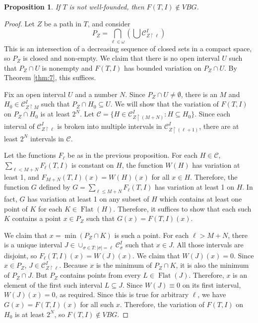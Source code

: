 \documentclass[12pt]{amsart}
\newtheorem{prop}[theorem]{Proposition}
\newcommand{\uhr}{\upharpoonright}
\newcommand{\C}{\mathcal C}
\renewcommand{\flat}{\operatorname{Flat}}
\begin{document}
\begin{prop}\label{prop:14} 
If $T$ is not well-founded, then $F(T,I) \not\in VBG$.
\end{prop}
\begin{proof}
Let $Z$ be a path in $T$, and consider 
$$P_Z = \bigcap_{\ell\in \omega} \left(\bigcup \C_{Z\uhr \ell}^I\right)$$
This is an intersection of a decreasing sequence of closed sets in a 
compact space, so $P_Z$ is closed and non-empty.  
We claim that there is no open interval $U$ such that $P_Z \cap U$ is 
nonempty and $F(T,I)$ has 
bounded variation on $P_Z \cap U$.  By Theorem \ref{thm:7}, this suffices.

Fix an open interval $U$ and a number $N$.  Since $P_Z \cap U \neq \emptyset$, 
there is an $M$ and $H_0 \in \C_{Z\uhr M}^I$ such that $P_Z\cap H_0 \subseteq U$.  
We will show that the variation of 
$F(T,I)$ on $P_Z \cap H_0$ is at least $2^N$.
Let $\C = \{H \in \C_{Z\uhr (M+N)}^I : H \subseteq H_0\}$.  Since each interval of 
$\C_{Z\uhr \ell}^I$ is broken into multiple intervals 
in $\C_{Z\uhr (\ell+1)}^I$, there are at least $2^N$ intervals in $\C$.

Let the functions $F_\ell$ be as in the previous proposition.
For each $H \in \C$, $\sum_{\ell < M+N} F_\ell(T,I)$ is constant on $H$, 
the function $W(H)$ has variation at least 1, 
and $F_{M+N}(T,I)(x)=W(H)(x)$ for all $x \in H$.
Therefore, the function $G$ defined by 
$G=\sum_{\ell \leq M+N} F_{\ell}(T,I)$ has variation at least 1 on $H$.  
In fact, $G$ has variation at least 1 on any subset of $H$ 
which contains at least one point of $K$ for each $K \in \flat(H)$.  
Therefore, it suffices to show that each such $K$ 
contains a point $x \in P_Z$ such that $G(x) = F(T,I)(x)$. 

We claim that $x= \min (P_Z \cap K)$ is such a point.
For each $\ell > M+N$, there is a unique interval 
$J \in \cup_{\sigma \in T : |\sigma| = \ell} 
\mathcal C^I_{\sigma}$ such that $x \in J$.  All those intervals are disjoint, 
so $F_\ell(T,I)(x) = W(J)(x)$.  We claim that $W(J)(x) = 0$.
Since $x \in P_Z$, $J \in \mathcal C^I_{Z \uhr \ell}$.  
Because $x$ is the minimum 
of $P_Z \cap K$, it is also the minimum of $P_Z \cap J$. 
But $P_Z$ contains points from every $L \in \flat(J)$.  
Therefore, $x$ is an element of the first 
such interval $L \subseteq J$.  
Since $W(J) \equiv 0$ on its first interval,
$W(J)(x) = 0$, as required.  Since this is true for arbitrary $\ell$, we have 
$G(x) = F(T,I)(x)$ for all such $x$.  Therefore, the variation of $F(T,I)$ on 
$H_0$ is at least $2^N$, so $F(T,I) \not\in VBG$.
\end{proof}
\end{document}
